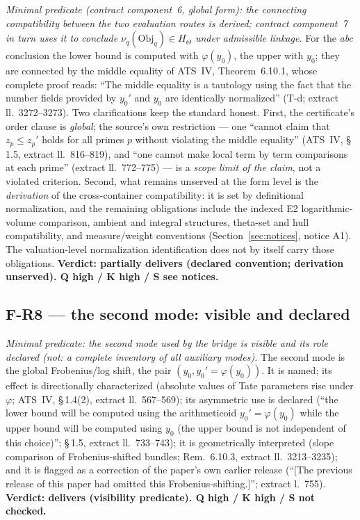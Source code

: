 \documentclass[11pt,a4paper]{article}
\begin{document}
\emph{Minimal predicate (contract component~6, global form): the connecting
compatibility between the two evaluation routes is derived; contract
component~7 in turn uses it to conclude $\nu_q(\mathrm{Obj}_q) \in H_\Theta$
under admissible linkage.} For the \emph{abc} conclusion the lower bound is computed
with $\varphi(y_0)$, the upper with $y_0$; they are connected by the middle
equality of ATS~IV, Theorem~6.10.1, whose complete proof reads: ``The middle
equality is a tautology using the fact that the number fields provided by
$y_0'$ and $y_0$ are identically normalized'' (T-d; extract ll.~3272--3273).
Two clarifications keep the standard honest. First, the certificate's order
clause is \emph{global}; the source's own restriction --- one ``cannot claim
that $z_p \le z_p'$ holds for all primes $p$ without violating the middle
equality'' (ATS~IV, \S\,1.5, extract ll.~816--819), and ``one cannot make local
term by term comparisons at each prime'' (extract ll.~772--775) --- is a
\emph{scope limit of the claim}, not a violated criterion. Second, what
remains unserved at the form level is the \emph{derivation} of the
cross-container compatibility: it is set by definitional normalization, and
the remaining obligations include the indexed E2 logarithmic-volume
comparison, ambient and integral structures, theta-set and hull
compatibility, and measure/weight conventions
(Section~\ref{sec:notices}, notice A1). The valuation-level normalization
identification does not by itself carry those obligations.
\textbf{Verdict: partially delivers (declared convention; derivation
unserved). Q high / K high / S see notices.}

\subsection{F-R8 --- the second mode: visible and declared}\label{sec:r8}

\emph{Minimal predicate: the second mode used by the bridge is visible and
its role declared (not: a complete inventory of all auxiliary modes).} The
second mode is the global Frobenius/log shift, the pair
$(y_0, y_0' = \varphi(y_0))$. It is named; its effect is directionally
characterized (absolute values of Tate parameters rise under $\varphi$;
ATS~IV, \S\,1.4(2), extract ll.~567--569); its asymmetric use is declared
(``the lower bound will be computed using the arithmeticoid
$y_0'=\varphi(y_0)$ while the upper bound will be computed using $y_0$ (the
upper bound is not independent of this choice)''; \S\,1.5, extract
ll.~733--743); it is geometrically interpreted (slope comparison of
Frobenius-shifted bundles; Rem.~6.10.3, extract ll.~3213--3235); and it is
flagged as a correction of the paper's own earlier release (``[The previous
release of this paper had omitted this Frobenius-shifting.]''; extract
l.~755). \textbf{Verdict: delivers (visibility predicate). Q high / K high /
S not checked.}
\end{document}
